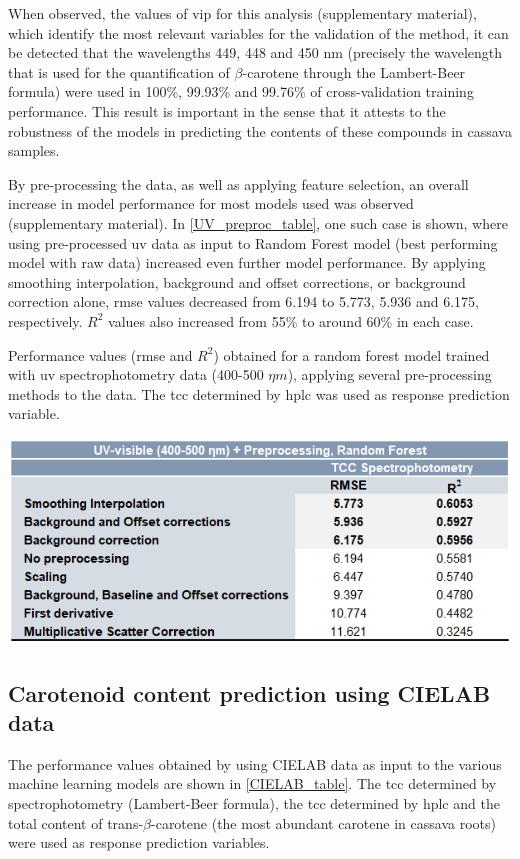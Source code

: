 When observed, the values of \acrfull{vip} for this analysis (supplementary material), which identify the most relevant variables for the validation of the method, it can be detected that the wavelengths 449, 448 and 450 nm (precisely the wavelength that is used for the quantification of $\beta$-carotene through the Lambert-Beer formula) were used in 100\%, 99.93\% and 99.76\% of cross-validation training performance. This result is important in the sense that it attests to the robustness of the models in predicting the contents of these compounds in cassava samples.

By pre-processing the data, as well as applying feature selection, an overall increase in model performance for most models used was observed (supplementary material). In \autoref{UV_preproc_table}, one such case is shown, where using pre-processed \gls{uv} data as input to Random Forest model (best performing model with raw data) increased even further model performance. By applying smoothing interpolation, background and offset corrections, or background correction alone, \gls{rmse} values decreased from 6.194 to 5.773, 5.936 and 6.175, respectively. $R^{2}$ values also increased from 55\% to around 60\% in each case.


\begin{table}[h]
	\centering
	\caption{Performance values (\gls{rmse} and $R^{2}$) obtained for a random forest model trained with \gls{uv} spectrophotometry data (400-500 $\eta m$), applying several pre-processing methods to the data. The \gls{tcc} determined by \gls{hplc} was used as response prediction variable.}	
	\includegraphics[width=0.8\linewidth]{Imagens/Case_study/UV_preproc_table}
	\label{UV_preproc_table}	
\end{table}


\subsection{Carotenoid content prediction using CIELAB data} \label{ml_cielab_subsec}

The performance values obtained by using CIELAB data as input to the various machine learning models are shown in \autoref{CIELAB_table}. The \gls{tcc} determined by spectrophotometry (Lambert-Beer formula), the \gls{tcc} determined by \gls{hplc} and the total content of trans-$\beta$-carotene (the most abundant carotene in cassava roots) were used as response prediction variables.


